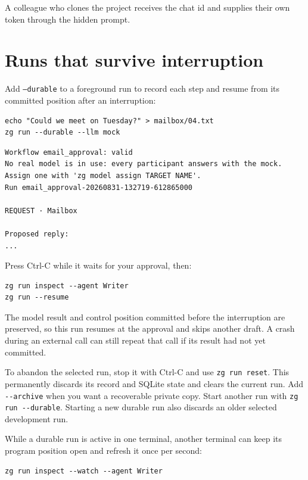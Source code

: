 \documentclass[11pt,a4paper]{article}
\begin{document}
A colleague who clones the project receives the chat id and supplies their own
token through the hidden prompt.

\section{Runs that survive interruption}

Add \texttt{--durable} to a foreground run to record each step and resume from
its committed position after an interruption:

\begin{lstlisting}[style=shell]
echo "Could we meet on Tuesday?" > mailbox/04.txt
zg run --durable --llm mock
\end{lstlisting}

\begin{lstlisting}
Workflow email_approval: valid
No real model is in use: every participant answers with the mock. Assign one with 'zg model assign TARGET NAME'.
Run email_approval-20260831-132719-612865000

REQUEST · Mailbox

Proposed reply:
...
\end{lstlisting}

Press Ctrl-C while it waits for your approval, then:

\begin{lstlisting}[style=shell]
zg run inspect --agent Writer
zg run --resume
\end{lstlisting}

The model result and control position committed before the interruption are
preserved, so this run resumes at the approval and skips another draft. A crash
during an external call can still repeat that call if its result had not yet
committed.

To abandon the selected run, stop it with Ctrl-C and use \texttt{zg run
reset}. This permanently discards its record and SQLite state and clears the
current run. Add \texttt{-{}-archive} when you want a recoverable private copy.
Start another run with \texttt{zg run -{}-durable}. Starting a new durable run
also discards an older selected development run.

While a durable run is active in one terminal, another terminal can keep its
program position open and refresh it once per second:

\begin{lstlisting}[style=shell]
zg run inspect --watch --agent Writer
\end{lstlisting}
\end{document}
